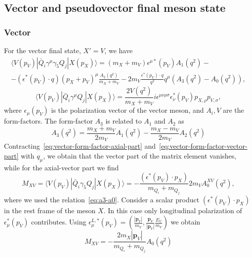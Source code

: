 \documentclass[a4paper,12pt,dvipsnames,usernames]{article}
\begin{document}
\subsection{Vector and pseudovector final meson state}
\subsubsection{Vector}
\label{app:vector}
For the vector final state, $X' = V$, we have~\cite{Ebert:1997mg,Ball:2004rg}
\begin{multline}
    \langle V(p_{V})| \bar{Q}_{i}\gamma^{\mu}\gamma_{5}Q_{j} |X(p_{X})\rangle = (m_{X}+m_{V})\epsilon^{\mu *}(p_{V})A_{1}(q^{2}) - \\ -(\epsilon^{*}(p_{V})\cdot q)(p_{X} + p_{V})^{\mu}\frac{A_{2}(q^{2})}{m_{X}+m_{V}}-2m_{V}\frac{\epsilon^{*}(p_{V})\cdot q}{q^{2}}q^{\mu}(A_{3}(q^{2})-A_{0}(q^{2})),
    \label{eq:vector-form-factor-axial-part}
\end{multline}
\begin{equation}
     \langle V(p_{V})| \bar{Q}_{i}\gamma^{\mu}Q_{j} |X(p_{X})\rangle= \frac{2V(q^{2})}{m_{X}+m_{V}}i\epsilon^{\mu\nu\rho\sigma}\epsilon^{*}_{\nu}(p_{V})p_{X, \rho}p_{V, \sigma},
     \label{eq:vector-form-factor-vector-part}
\end{equation}
where $\epsilon_{\mu}(p_{V})$ is the polarization vector of the vector meson, and $A_{i}, V$ are the form-factors. The form-factor $A_{3}$ is related to $A_{1}$ and $A_{2}$ as
\begin{equation}
    A_{3}(q^{2}) = \frac{m_{X}+m_{V}}{2m_{V}}A_{1}(q^{2})-\frac{m_{X} - m_{V}}{2m_{V}}A_{2}(q^{2})
    \label{eq:a3-a0}
\end{equation}
Contracting~\eqref{eq:vector-form-factor-axial-part} and~\eqref{eq:vector-form-factor-vector-part} with $q_{\mu}$, we obtain that the vector part of the matrix element vanishes, while for the axial-vector part we find
\begin{equation}
    M_{XV} = \langle V(p_{V})| \bar{Q}_{i}\gamma_{5}Q_{j} |X(p_{X})\rangle = -\frac{(\epsilon^{*}(p_{V}) \cdot p_{X})}{m_{Q_{i}}+m_{Q_{j}}}2m_{V}A^{XV}_{0}(q^{2}),
\end{equation}
where we used the relation~\eqref{eq:a3-a0}. Consider a scalar product $(\epsilon^{*}(p_{V}) \cdot p_{X})$ in the rest frame of the meson $X$. In this case only longitudinal polarization of $\epsilon^{*}_{\mu}(p_{V})$ contributes. Using $\epsilon_{\mu}^{L,*}(p_{V}) = \left(\frac{|\bm{p}_{V}|}{m_{V}},\frac{\bm{p}_{V}}{|\bm{p}_{V}|}\frac{E_{V}}{m_{V}}\right)$ we obtain
\begin{equation}
    M_{XV} = -\frac{2m_{X}|\bm{p}_{V}|}{m_{Q_{i}}+m_{Q_{j}}}A_{0}(q^{2})
\end{equation}
\end{document}
